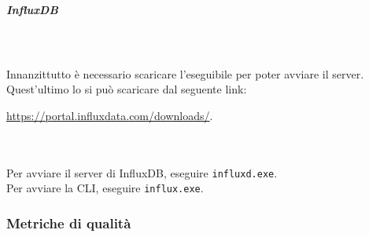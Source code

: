	\subparagraph{InfluxDB}\mbox{} \\ \mbox{} \\
	Innanzittutto è necessario scaricare l'eseguibile per poter avviare il server.
    Quest'ultimo lo si può scaricare dal seguente link:\\
	\centerline{\url{https://portal.influxdata.com/downloads/}.} 
    
	 \mbox{} \\ \mbox{} \\
	Per avviare il server di InfluxDB, eseguire \texttt{influxd.exe}. \\
	Per avviare la CLI, eseguire \texttt{influx.exe}.
	\subsubsection{Metriche di qualità}
